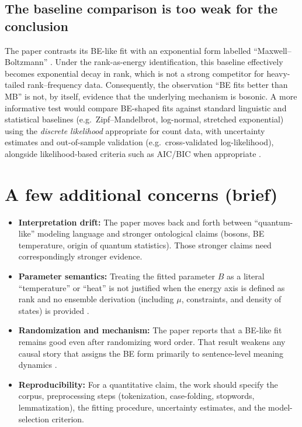 \documentclass[11pt,a4paper]{article}
\begin{document}
\subsection{The baseline comparison is too weak for the conclusion}
The paper contrasts its BE-like fit with an exponential form labelled ``Maxwell--Boltzmann'' \citep{Aerts2024Origin}. Under the rank-as-energy identification, this baseline effectively becomes exponential decay in rank, which is not a strong competitor for heavy-tailed rank--frequency data. Consequently, the observation ``BE fits better than MB'' is not, by itself, evidence that the underlying mechanism is bosonic.
A more informative test would compare BE-shaped fits against standard linguistic and statistical baselines (e.g.\ Zipf--Mandelbrot, log-normal, stretched exponential) using the \emph{discrete likelihood} appropriate for count data, with uncertainty estimates and out-of-sample validation (e.g.\ cross-validated log-likelihood), alongside likelihood-based criteria such as AIC/BIC when appropriate \citep{Clauset2009}.

\section{A few additional concerns (brief)}
\begin{itemize}
\item \textbf{Interpretation drift:} The paper moves back and forth between ``quantum-like'' modeling language and stronger ontological claims (bosons, BE temperature, origin of quantum statistics). Those stronger claims need correspondingly stronger evidence.
\item \textbf{Parameter semantics:} Treating the fitted parameter $B$ as a literal ``temperature'' or ``heat'' is not justified when the energy axis is defined as rank and no ensemble derivation (including $\mu$, constraints, and density of states) is provided \citep{PathriaBeale}.
\item \textbf{Randomization and mechanism:} The paper reports that a BE-like fit remains good even after randomizing word order. That result weakens any causal story that assigns the BE form primarily to sentence-level meaning dynamics \citep{Aerts2024Origin}.
\item \textbf{Reproducibility:} For a quantitative claim, the work should specify the corpus, preprocessing steps (tokenization, case-folding, stopwords, lemmatization), the fitting procedure, uncertainty estimates, and the model-selection criterion.
\end{itemize}
\end{document}

